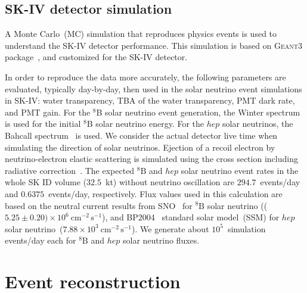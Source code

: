 \documentclass[aps,prd,reprint,superscriptaddress,floatfix,altaffilletter,nofootinbib]{revtex4-2}
\begin{document}
\subsection{SK-IV detector simulation} \label{sec:simulation}
A Monte Carlo~(MC) simulation that reproduces physics events is used to understand the SK-IV detector performance.
This simulation is based on \textsc{Geant3} package~\cite{Brun:1994aa}, and customized for the SK-IV detector.

In order to reproduce the data more accurately, the following parameters are evaluated, typically day-by-day,
then used in the solar neutrino event simulations in SK-IV:  
water transparency,
TBA of the water transparency,
PMT dark rate, and PMT gain.
For the $^{8}$B solar neutrino event generation, the Winter
spectrum~\cite{Winter:2004kf} is used for the initial $^{8}$B solar neutrino energy.
For the $hep$ solar neutrinos, the Bahcall spectrum~\cite{hep} is used.
We consider the actual detector live time when simulating the direction of solar neutrinos. 
Ejection of a recoil electron by neutrino-electron elastic
scattering is simulated using the cross section including radiative correction~\cite{Bahcall:1995mm}.
The expected $\mathrm{{^8}B}$ and $hep$ solar neutrino event rates in the whole SK ID volume ($32.5$~kt) without neutrino oscillation
are $294.7$~events/day and $0.6375$~events/day, respectively.
Flux values used in this calculation are based on the neutral current results from SNO~\cite{Aharmim:2011vm} for $\mathrm{{^8}B}$ solar neutrino (($5.25 \pm 0.20) \times 10^{6}~\mathrm{cm^{-2}\,s^{-1}}$), and BP2004~\cite{Bahcall:2004fg} standard solar model~(SSM) for $hep$ solar neutrino~($7.88 \times 10^{3}~\mathrm{cm^{-2}\,s^{-1}}$).
We generate about $10^5$~simulation events/day each for  $\mathrm{{^8}B}$ and $hep$ solar neutrino fluxes.






\section{Event reconstruction} \label{sec_recon}
\end{document}
